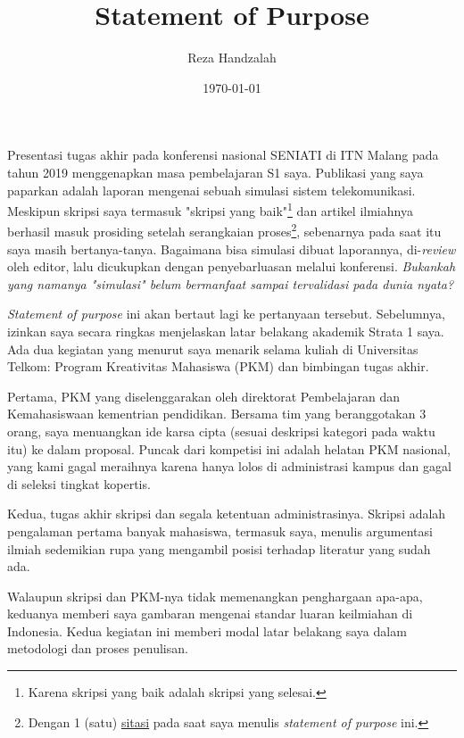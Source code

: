 \documentclass[12pt,a4paper]{article}
\title{\vspace{-2em}Statement of Purpose}
\author{Reza Handzalah}
\date{\today}
\begin{document}
\maketitle
\thispagestyle{empty}

Presentasi tugas akhir pada konferensi nasional SENIATI di ITN Malang pada tahun 2019 menggenapkan masa pembelajaran S1 saya.
Publikasi yang saya paparkan adalah laporan mengenai sebuah simulasi sistem telekomunikasi.
Meskipun skripsi saya termasuk "skripsi yang baik"\footnote{Karena skripsi yang baik adalah skripsi yang selesai.}
dan artikel ilmiahnya berhasil masuk prosiding setelah serangkaian proses\footnote{Dengan 1 (satu) \href{https://scholar.google.com/scholar?cites=10594950162121343959}{sitasi} 
pada saat saya menulis \emph{statement of purpose} ini.}, sebenarnya pada saat itu saya masih bertanya-tanya.
Bagaimana bisa simulasi dibuat laporannya, di-\emph{review} oleh editor, lalu dicukupkan dengan penyebarluasan melalui konferensi.
\emph{Bukankah yang namanya "simulasi" belum bermanfaat sampai tervalidasi pada dunia nyata?}

\vspace{\baselineskip}
\emph{Statement of purpose} ini akan bertaut lagi ke pertanyaan tersebut. Sebelumnya, izinkan saya secara ringkas menjelaskan latar belakang
akademik Strata 1 saya.
Ada dua kegiatan yang menurut saya menarik selama kuliah di Universitas Telkom: Program Kreativitas Mahasiswa (PKM) dan bimbingan tugas akhir.

Pertama, PKM yang diselenggarakan oleh direktorat Pembelajaran dan Kemahasiswaan kementrian pendidikan.
Bersama tim yang beranggotakan 3 orang, saya menuangkan ide karsa cipta (sesuai deskripsi kategori pada waktu itu) ke dalam proposal.
Puncak dari kompetisi ini adalah helatan PKM nasional, yang kami gagal meraihnya karena hanya lolos di administrasi kampus dan gagal di
seleksi tingkat kopertis.

Kedua, tugas akhir skripsi dan segala ketentuan administrasinya.
Skripsi adalah pengalaman pertama banyak mahasiswa, termasuk saya, menulis argumentasi ilmiah sedemikian rupa yang mengambil posisi
terhadap literatur yang sudah ada.

Walaupun skripsi dan PKM-nya tidak memenangkan penghargaan apa-apa, keduanya memberi saya gambaran mengenai
standar luaran keilmiahan di Indonesia.
Kedua kegiatan ini memberi modal latar belakang saya dalam metodologi dan proses penulisan.
\end{document}
